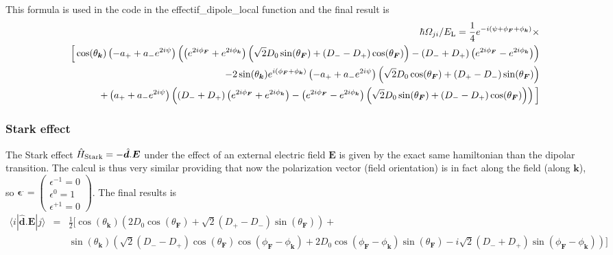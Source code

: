\documentclass[amsmath,amssymb,nofootinbib]{revtex4-2}
\begin{document}
	 	 	 This formula is used in the code in the effectif\_dipole\_local function and the final result is 	 
	  \begin{eqnarray*}
	 	& & 	 \hbar  \Omega_{ji} /  E_{\rm L}  =   \frac{1}{4} e^{-i
	 		(\psi +{\phi_{\bm F}}+{\phi_{\bm k}})} \times \\
	 	&  & \Big[   \cos ({\theta_{\bm k}}) \left(-{a_+}+{a_-}
	 	e^{2 i \psi }\right) \left(\left(e^{2 i {\phi_{\bm F}}}+e^{2 i
	 		{\phi_{\bm k}}}\right) \left(\sqrt{2} {D_0} \sin ({\theta_{\bm F}})+({D_-}-{D_+}) \cos ({\theta_{\bm F}})\right)-({D_-}+{D_+}) \left(e^{2 i {\phi_{\bm F}}}-e^{2 i
	 		{\phi_{\bm k}}}\right)\right) \\
	 	&  & -2 \sin ({\theta_{\bm k}}) e^{i
	 		({\phi_{\bm F}}+{\phi_{\bm k}})} \left(-{a_+}+{a_-} e^{2 i \psi }\right) \left(\sqrt{2} {D_0} \cos ({\theta_{\bm F}})+({D_+}-{D_-}) \sin ({\theta_{\bm F}})\right) \\
	 	& & +\left({a_+}+{a_-} e^{2 i \psi
	 	}\right) \left(({D_-}+{D_+}) \left(e^{2 i {\phi_{\bm F}}}+e^{2 i
	 		{\phi_{\bm k}}}\right)-\left(e^{2 i {\phi_{\bm F}}}-e^{2 i {\phi_{\bm k}}}\right) \left(\sqrt{2} {D_0} \sin({\theta_{\bm F}})+({D_-}-{D_+}) \cos ({\theta_{\bm F}})\right)\right) \Big]
	 \end{eqnarray*}	 


	\subsubsection{Stark effect}
\label{Stark}

The Stark effect $\hat H_{\rm Stark}  = -\hat {\bm d}.\bm E$ under the effect of an external electric field $\bm E$ is given by the exact same hamiltonian than the dipolar transition. The calcul is thus very similar providing that now the polarization vector (field orientation) is in fact along the field (along $\bm k$), so  $ {\bm \epsilon}^. = \begin{pmatrix} \epsilon^{-1}=0 \\ \epsilon^{0}=1 \\ \epsilon^{+1}=0
\end{pmatrix}$. The final results is
	  \begin{eqnarray}
\langle i | \hat {\bm d}.\bm E | j \rangle &= &
 \frac{1}{2} \Big[ 
 \cos({\theta_{\bm k}})\left( 2 D_0 \cos({\theta_{\bm F}}) + \sqrt{2}(D_+-D_-) \sin({\theta_{\bm F}}) \right)+ \\
 & &
 \sin({\theta_{\bm k}}) \left(
 \sqrt{2}(D_--D_+) \cos({\theta_{\bm F}}) \cos(\phi_{\bm F}-\phi_{\bm k}) + 2 D_0 \cos(\phi_{\bm F}-\phi_{\bm k}) 
\sin({\theta_{\bm F}})  - i \sqrt{2} (D_-+D_+)  \sin(\phi_{\bm F}-\phi_{\bm k})  \right) 
 \Big] \nonumber
\end{eqnarray}	
\end{document}
